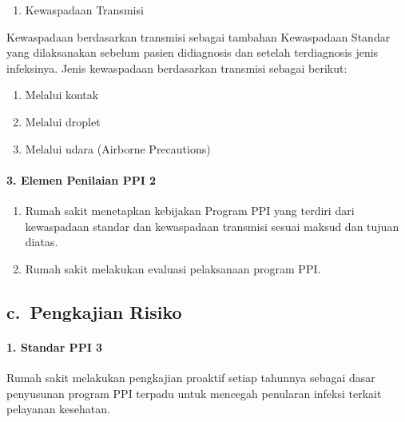 \documentclass[
]{book}
\providecommand{\tightlist}{%
  \setlength{\itemsep}{0pt}\setlength{\parskip}{0pt}}
\begin{document}
\begin{enumerate}
\def\labelenumi{\alph{enumi}.}
\setcounter{enumi}{1}
\tightlist
\item
  Kewaspadaan Transmisi
\end{enumerate}

Kewaspadaan berdasarkan transmisi sebagai tambahan Kewaspadaan Standar yang dilaksanakan sebelum pasien didiagnosis dan setelah terdiagnosis jenis infeksinya. Jenis kewaspadaan berdasarkan transmisi sebagai berikut:

\begin{enumerate}
\def\labelenumi{\arabic{enumi}.}
\tightlist
\item
  Melalui kontak
\item
  Melalui droplet
\item
  Melalui udara (Airborne Precautions)
\end{enumerate}

\hypertarget{elemen-penilaian-ppi-2}{%
\paragraph*{3. Elemen Penilaian PPI 2}\label{elemen-penilaian-ppi-2}}

\begin{enumerate}
\def\labelenumi{\alph{enumi}.}
\tightlist
\item
  Rumah sakit menetapkan kebijakan Program PPI yang terdiri dari kewaspadaan standar dan kewaspadaan transmisi sesuai maksud dan tujuan diatas.
\item
  Rumah sakit melakukan evaluasi pelaksanaan program PPI.
\end{enumerate}

\hypertarget{c.-pengkajian-risiko}{%
\subsection*{c.~Pengkajian Risiko}\label{c.-pengkajian-risiko}}

\hypertarget{standar-ppi-3}{%
\paragraph*{1. Standar PPI 3}\label{standar-ppi-3}}

Rumah sakit melakukan pengkajian proaktif setiap tahunnya sebagai dasar penyusunan program PPI terpadu untuk mencegah penularan infeksi terkait pelayanan kesehatan.
\end{document}
